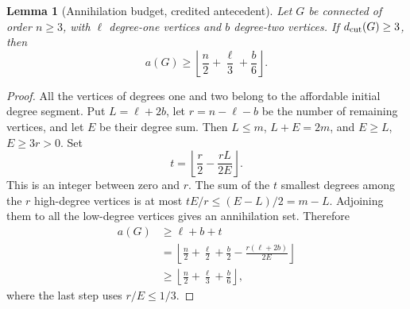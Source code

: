 \documentclass[11pt,a4paper]{article}
\newtheorem{lemma}[theorem]{Lemma}
\theoremstyle{definition}\newtheorem{definition}[theorem]{Definition}
\theoremstyle{remark}\newtheorem{remark}[theorem]{Remark}
\newcommand{\floor}[1]{\left\lfloor#1\right\rfloor}
\begin{document}
\begin{lemma}[Annihilation budget, credited antecedent]
\label{early:lem:annihilation-budget}
Let $G$ be connected of order $n\geq3$, with $\ell$ degree-one
vertices and $b$ degree-two vertices.  If $d_{\rm cut}(G)\geq3$,
then
\[
 a(G)\geq\floor{\frac n2+\frac\ell3+\frac b6}.
\]
\end{lemma}
\begin{proof}
All the vertices of degrees one and two belong to the affordable
initial degree segment.  Put $L=\ell+2b$, let
$r=n-\ell-b$ be the number of remaining vertices, and let $E$ be
their degree sum.  Then $L\leq m$, $L+E=2m$, and
$E\geq L$, $E\geq3r>0$.  Set
\[
 t=\floor{\frac r2-\frac{rL}{2E}}.
\]
This is an integer between zero and $r$.  The sum of the $t$
smallest degrees among the $r$ high-degree vertices is at most
$tE/r\leq(E-L)/2=m-L$.  Adjoining them to all the low-degree
vertices gives an annihilation set.  Therefore
\begin{align*}
 a(G)&\geq\ell+b+t\\
 &=\floor{\frac n2+\frac\ell2+\frac b2
                  -\frac{r(\ell+2b)}{2E}}\\
 &\geq\floor{\frac n2+\frac\ell3+\frac b6},
\end{align*}
where the last step uses $r/E\leq1/3$.
\end{proof}
\end{document}

